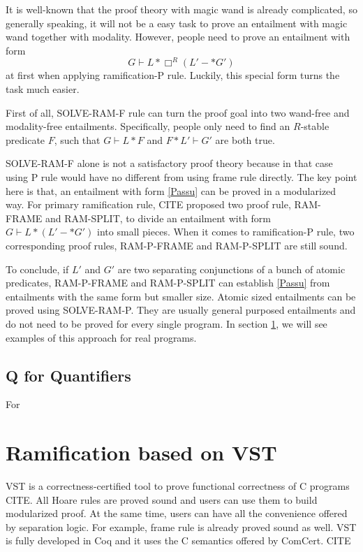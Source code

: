 It is well-known that the proof theory with magic wand is already complicated, so generally speaking, it will not be a easy task to prove an entailment with magic wand together with modality. However, people need to prove an entailment with form
\begin{equation}G \vdash  L * \Box^R (L' -* G') \label{eqn:Passu} \end{equation}
at first when applying ramification-P rule. Luckily, this special form turns the task much easier.

First of all, SOLVE-RAM-F rule can turn the proof goal into two wand-free and modality-free entailments. Specifically, people only need to find an $R$-stable predicate $F$, such that $G \vdash L * F$ and $F * L' \vdash G'$ are both true. 

SOLVE-RAM-F alone is not a satisfactory proof theory because in that case using P rule would have no different from using frame rule directly. The key point here is that, an entailment with form \ref{Passu} can be proved in a modularized way. For primary ramification rule, CITE proposed two proof rule, RAM-FRAME and RAM-SPLIT, to divide an entailment with form $G \vdash L * (L' -* G')$ into small pieces. When it comes to ramification-P rule, two corresponding proof rules, RAM-P-FRAME and RAM-P-SPLIT are still sound.

To conclude, if $L'$ and $G'$ are two separating conjunctions of a bunch of atomic predicates, RAM-P-FRAME and RAM-P-SPLIT can establish \ref{Passu} from entailments with the same form but smaller size. Atomic sized entailments can be proved using SOLVE-RAM-P. They are usually general purposed entailments and do not need to be proved for every single program. In section \ref{vst}, we will see examples of this approach for real programs.

\subsection{Q for Quantifiers}

For

\section{Ramification based on VST}\label{vst}


VST is a correctness-certified tool to prove functional correctness of C programs CITE. All Hoare rules are proved sound and users can use them to build modularized proof. At the same time, users can have all the convenience offered by separation logic. For example, frame rule is already proved sound as well. VST is fully developed in Coq and it uses the C semantics offered by ComCert. CITE

